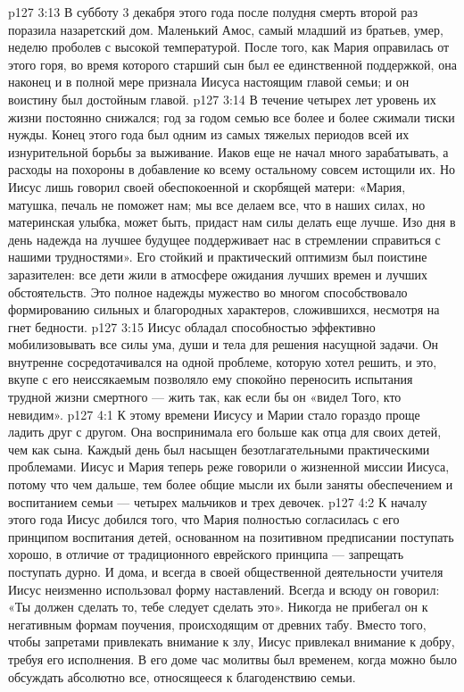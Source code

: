 \vs p127 3:13 \pc В субботу 3 декабря этого года после полудня смерть второй раз поразила назаретский дом. Маленький Амос, самый младший из братьев, умер, неделю проболев с высокой температурой. После того, как Мария оправилась от этого горя, во время которого старший сын был ее единственной поддержкой, она наконец и в полной мере признала Иисуса настоящим главой семьи; и он воистину был достойным главой.
\vs p127 3:14 В течение четырех лет уровень их жизни постоянно снижался; год за годом семью все более и более сжимали тиски нужды. Конец этого года был одним из самых тяжелых периодов всей их изнурительной борьбы за выживание. Иаков еще не начал много зарабатывать, а расходы на похороны в добавление ко всему остальному совсем истощили их. Но Иисус лишь говорил своей обеспокоенной и скорбящей матери: «Мария, матушка, печаль не поможет нам; мы все делаем все, что в наших силах, но материнская улыбка, может быть, придаст нам силы делать еще лучше. Изо дня в день надежда на лучшее будущее поддерживает нас в стремлении справиться с нашими трудностями». Его стойкий и практический оптимизм был поистине заразителен: все дети жили в атмосфере ожидания лучших времен и лучших обстоятельств. Это полное надежды мужество во многом способствовало формированию сильных и благородных характеров, сложившихся, несмотря на гнет бедности.
\vs p127 3:15 Иисус обладал способностью эффективно мобилизовывать все силы ума, души и тела для решения насущной задачи. Он внутренне сосредотачивался на одной проблеме, которую хотел решить, и это, вкупе с его неиссякаемым  позволяло ему спокойно переносить испытания трудной жизни смертного --- жить так, как если бы он «видел Того, кто невидим».
\vs p127 4:1 К этому времени Иисусу и Марии стало гораздо проще ладить друг с другом. Она воспринимала его больше как отца для своих детей, чем как сына. Каждый день был насыщен безотлагательными практическими проблемами. Иисус и Мария теперь реже говорили о жизненной миссии Иисуса, потому что чем дальше, тем более общие мысли их были заняты обеспечением и воспитанием семьи --- четырех мальчиков и трех девочек.
\vs p127 4:2 К началу этого года Иисус добился того, что Мария полностью согласилась с его принципом воспитания детей, основанном на позитивном предписании поступать хорошо, в отличие от традиционного еврейского принципа --- запрещать поступать дурно. И дома, и всегда в своей общественной деятельности учителя Иисус неизменно использовал  форму наставлений. Всегда и всюду он говорил: «Ты должен сделать то, тебе следует сделать это». Никогда не прибегал он к негативным формам поучения, происходящим от древних табу. Вместо того, чтобы запретами привлекать внимание к злу, Иисус привлекал внимание к добру, требуя его исполнения. В его доме час молитвы был временем, когда можно было обсуждать абсолютно все, относящееся к благоденствию семьи.
